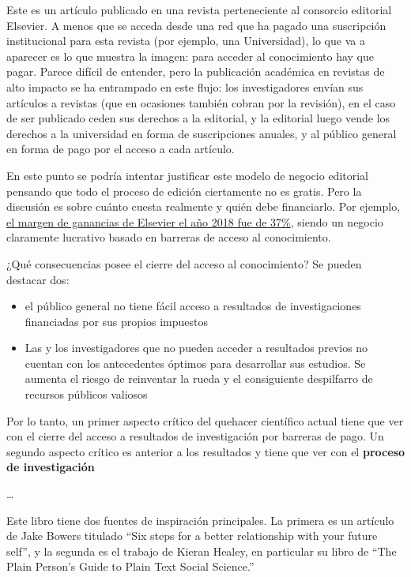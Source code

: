 \documentclass[
  11pt,
]{book}
\begin{document}
Este es un artículo publicado en una revista perteneciente al consorcio editorial Elsevier. A menos que se acceda desde una red que ha pagado una suscripción institucional para esta revista (por ejemplo, una Universidad), lo que va a aparecer es lo que muestra la imagen: para acceder al conocimiento hay que pagar. Parece difícil de entender, pero la publicación académica en revistas de alto impacto se ha entrampado en este flujo: los investigadores envían sus artículos a revistas (que en ocasiones también cobran por la revisión), en el caso de ser publicado ceden sus derechos a la editorial, y la editorial luego vende los derechos a la universidad en forma de suscripciones anuales, y al público general en forma de pago por el acceso a cada artículo.

En este punto se podría intentar justificar este modelo de negocio editorial pensando que todo el proceso de edición ciertamente no es gratis. Pero la discusión es sobre cuánto cuesta realmente y quién debe financiarlo. Por ejemplo, \href{https://www.thebookseller.com/news/elsevier-records-2-lifts-revenue-and-profits-960016}{el margen de ganancias de Elsevier el año 2018 fue de 37\%}, siendo un negocio claramente lucrativo basado en barreras de acceso al conocimiento.

¿Qué consecuencias posee el cierre del acceso al conocimiento? Se pueden destacar dos:

\begin{itemize}
\item
  el público general no tiene fácil acceso a resultados de investigaciones financiadas por sus propios impuestos
\item
  Las y los investigadores que no pueden acceder a resultados previos no cuentan con los antecedentes óptimos para desarrollar sus estudios. Se aumenta el riesgo de reinventar la rueda y el consiguiente despilfarro de recursos públicos valiosos
\end{itemize}

Por lo tanto, un primer aspecto crítico del quehacer científico actual tiene que ver con el cierre del acceso a resultados de investigación por barreras de pago. Un segundo aspecto crítico es anterior a los resultados y tiene que ver con el \textbf{proceso de investigación}

\ldots{}

Este libro tiene dos fuentes de inspiración principales. La primera es un artículo de Jake Bowers titulado ``Six steps for a better relationship with your future self'', y la segunda es el trabajo de Kieran Healey, en particular su libro de ``The Plain Person's Guide to Plain Text Social Science.'' \citep{Healy2018PlainPersonGuide}
\end{document}
